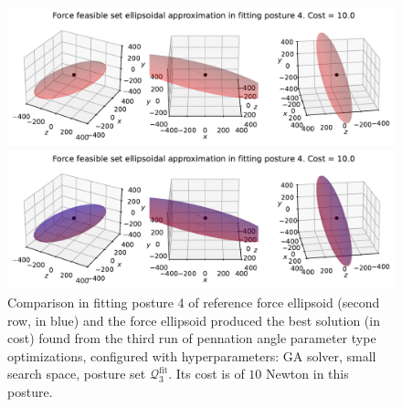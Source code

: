 \clearpage
\begin{figure}[!htb]
    \centering
    \captionsetup{justification=centering}
    
    \begin{minipage}{0.8\linewidth}
        \captionsetup{justification=centering}
        \centering
        \includegraphics[trim={0 0 0 0}, clip, width=1\linewidth]{img/chapter_4/reconstruction_stanford_imgs/ellipsoid_genetic_p3_pen_small_output_3214911_trial_3_fitting_posture_4.pdf}
    \end{minipage}
    \begin{minipage}{0.8\linewidth}
        \captionsetup{justification=centering}
        \centering
        \includegraphics[trim={0 0 0 20}, clip, width=1\linewidth]{img/chapter_4/reconstruction_stanford_imgs/ellipsoid_genetic_p3_pen_small_output_3214911_trial_3_fitting_posture_4_with_stanford.pdf}
    \end{minipage}
    \caption{Comparison in fitting posture 4 of reference force ellipsoid (second row, in blue) and the force ellipsoid produced the best solution (in cost) found from the third run of pennation angle parameter type optimizations, configured with hyperparameters: GA solver, small search space, posture set $\mathcal{Q}_3^{\text{fit}}$. Its cost is of $10$ Newton in this posture.}
    \label{fig:ellipsoid_genetic_p3_pen_small_output_3214911_trial_3_fitting_posture_4}
\end{figure}

